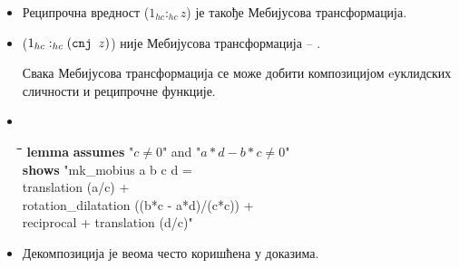 \documentclass[slidestop, compress, mathserif, containsverbatim, xcolor=dvipsnames]{beamer}
\begin{document}
\begin{frame}{}
  \begin{itemize}
  \item Реципрочна вредност ($1_{hc}:_{hc}z$) је такође Мебијусова трансформација. \vfill
  \item {} ($1_{hc}:_{hc} (\text{{\tt cnj\ }} z)$) није Мебијусова трансформација -- . \vfill
  \begin{block}{}
    Свака Мебијусова трансформација се може добити композицијом
    eуклидских сличности и реципрочне функције.
  \end{block}
\item \begin{footnotesize} {\tt
    \begin{tabbing}
      \hspace{5mm}\=\hspace{5mm}\=\hspace{5mm}\=\hspace{5mm}\=\hspace{5mm}\=\kill
      {\bf lemma} \= {\bf assumes} "$c\neq 0$" and "$a*d - b*c \neq 0$"\\
      {\bf shows} "{}mk\_mobius a b c d = \\
  \>\>\> translation (a/c) + \\
  \>\>\> rotation\_dilatation ((b*c - a*d)/(c*c)) + \\
  \>\>\> reciprocal + translation (d/c)"
    \end{tabbing}
    }
    \end{footnotesize} \vfill
  \item Декомпозиција је веома често коришћена у доказима.
  \end{itemize}
\end{frame}
\end{document}
